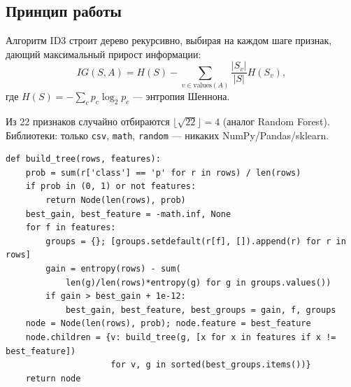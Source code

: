 \documentclass[12pt,a4paper]{article}
\begin{document}
\subsection{Принцип работы}

Алгоритм ID3 строит дерево рекурсивно, выбирая на каждом шаге признак,
дающий максимальный прирост информации:
\[
IG(S, A) = H(S) - \sum_{v \in \text{values}(A)} \frac{|S_v|}{|S|} H(S_v),
\]
где \(H(S) = -\sum_{c} p_c \log_2 p_c\) — энтропия Шеннона.


\medskip
Из 22 признаков случайно отбираются \(\lfloor\sqrt{22}\rfloor = 4\)
(аналог Random Forest). Библиотеки: только \texttt{csv}, \texttt{math},
\texttt{random} — никаких NumPy/Pandas/sklearn.

\begin{lstlisting}[caption={Построение дерева ID3 — выбор лучшего признака},label={lst:tree}]
def build_tree(rows, features):
    prob = sum(r['class'] == 'p' for r in rows) / len(rows)
    if prob in (0, 1) or not features:
        return Node(len(rows), prob)
    best_gain, best_feature = -math.inf, None
    for f in features:
        groups = {}; [groups.setdefault(r[f], []).append(r) for r in rows]
        gain = entropy(rows) - sum(
            len(g)/len(rows)*entropy(g) for g in groups.values())
        if gain > best_gain + 1e-12:
            best_gain, best_feature, best_groups = gain, f, groups
    node = Node(len(rows), prob); node.feature = best_feature
    node.children = {v: build_tree(g, [x for x in features if x != best_feature])
                     for v, g in sorted(best_groups.items())}
    return node
\end{lstlisting}
\end{document}
